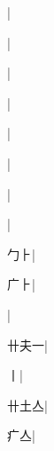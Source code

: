 \begin{multicols}{2}
{{}|{}\par
{}|{}\par
{\cjk{}{\cnsym{}　}{\cnsym{}　}{\cnsym{}　}}|{}\par
{}|{}\par
{}|{}\par
{}|{}\par
{}|{}\par
{}|{}\par
{\cjk{}{\cnsym{}　}勹{\cnrtwo{}⺊}}|{}\par
{\cjk{}{\cnsym{}　}广{\cnrtwo{}⺊}}|{}\par
{}|{}\par
{\cjk{}卄夫一}|{}\par
{\cjk{}{\cnsym{}　}{\cnsym{}　}丨}|{}\par
{\cjk{}卄土亼}|{}\par
{\cjk{}{\cnsym{}　}疒亼}|{}\par
}
\end{multicols}
